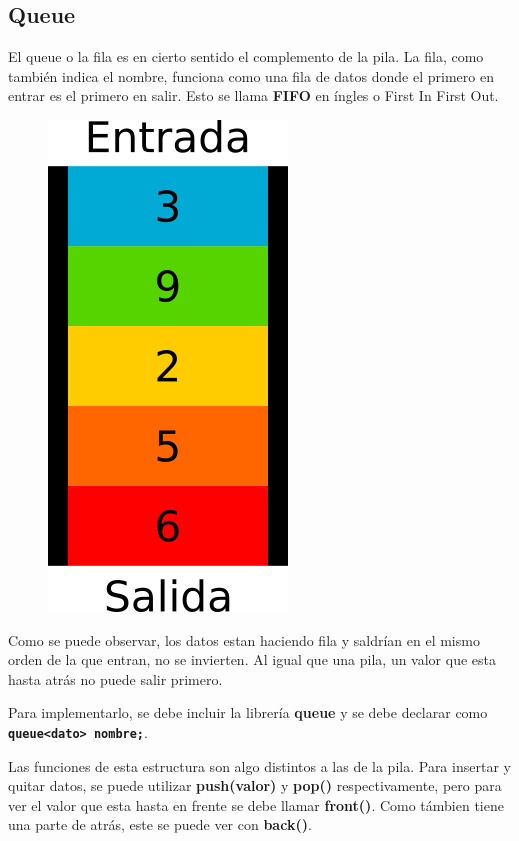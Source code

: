 \documentclass{article}
\begin{document}
\subsection{Queue}

El queue o la fila es en cierto sentido el complemento de la pila. La fila, como también indica el nombre, funciona como una fila de datos donde el primero en entrar es el primero en salir. Esto se llama \textbf{FIFO} en íngles o First In First Out.

\begin{figure}[H]
    \centering
    \includegraphics[width=0.1\paperwidth]{fila}
\end{figure}

Como se puede observar, los datos estan haciendo fila y saldrían en el mismo orden de la que entran, no se invierten. Al igual que una pila, un valor que esta hasta atrás no puede salir primero.

Para implementarlo, se debe incluir la librería \textbf{queue} y se debe declarar como \textbf{\lstinline{queue<dato> nombre;}}.

Las funciones de esta estructura son algo distintos a las de la pila. Para insertar y quitar datos, se puede utilizar \textbf{push(valor)} y \textbf{pop()} respectivamente, pero para ver el valor que esta hasta en frente se debe llamar \textbf{front()}. Como támbien tiene una parte de atrás, este se puede ver con \textbf{back()}.
\end{document}
